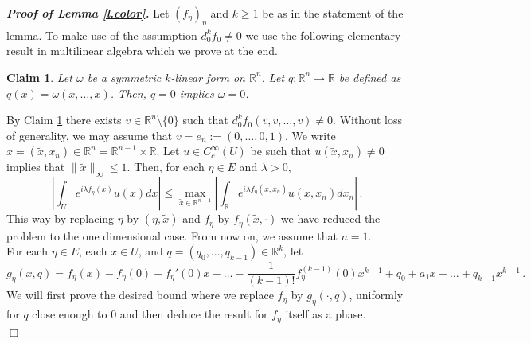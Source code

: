 \documentclass[10pt,twoside]{article}
\newcommand{\R}{\mathbb{R}}
\newenvironment{prf}[1][]
{\vskip 2mm  {\it \bf Proof#1. }}{$\Box$ \vskip 2mm}
\numberwithin{theorem}{section}
\newtheorem{claim}{Claim}
\begin{document}
\begin{prf}[ of Lemma \ref{l.color}]
Let $(f_\eta)_\eta$ and $k\geq 1$ be as in the statement of the lemma. To make use of the assumption $d^k_0f_0\neq 0$ we use the following elementary result in multilinear algebra which we prove at the end.

\begin{claim}\label{cl.color.2}
Let $\omega$ be a symmetric $k$-linear form on $\R^n$. Let $q:\R^n\rightarrow\R$ be defined as $q(x)=\omega(x,\dots,x)$. Then, $q=0$ implies $\omega=0$.
\end{claim}

By Claim \ref{cl.color.2} there exists $v\in\R^n\setminus\{0\}$ such that $d^k_0f_0(v,v,\dots,v)\neq 0$. Without loss of generality, we may assume that $v=e_n:=(0,\dots,0,1)$. We write $x=(\tilde{x},x_n)\in\R^n=\R^{n-1}\times\R$. Let $u\in C^\infty_c(U)$ be such that $u(\tilde{x},x_n)\neq 0$ implies that $\|\tilde{x}\|_{\infty}\leq 1$. Then, for each $\eta\in E$ and $\lambda>0$,
\[
\left|\int_Ue^{i\lambda f_\eta(x)}u(x)dx\right|\leq \max_{\tilde{x}\in\R^{n-1}}\left|\int_\R e^{i\lambda f_\eta(\tilde{x},x_n)}u(\tilde{x},x_n)dx_n\right|\, .
\]
This way by replacing $\eta$ by $(\eta,\tilde{x})$ and $f_\eta$ by $f_\eta(\tilde{x},\cdot)$ we have reduced the problem to the one dimensional case. From now on, we assume that $n=1$.\\

For each $\eta\in E$, each $x\in U$, and $q=(q_0,\dots,q_{k-1})\in\R^k$, let
\[
g_\eta(x,q)=f_\eta(x)-f_\eta(0)-f_\eta'(0)x-\dots -\frac{1}{(k-1)!}f_\eta^{(k-1)}(0)x^{k-1}+q_0+a_1x+\dots+q_{k-1} x^{k-1}\, .
\]
We will first prove the desired bound where we replace $f_\eta$ by  $g_\eta(\cdot,q)$, uniformly for $q$ close enough to $0$ and then deduce the result for $f_\eta$ itself as a phase.\\


\end{prf}
\end{document}
